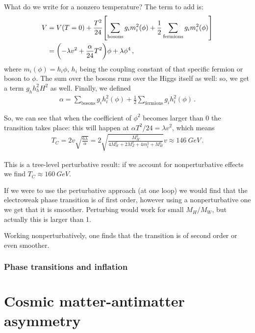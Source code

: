 \documentclass[main.tex]{subfiles}
\begin{document}
What do we write for a nonzero temperature? The term to add is: 
%
\begin{align}
V &= V(T = 0) + \frac{T^2}{24} \qty[ \sum _{\text{bosons}} g_i m_i^2 (\phi ) + \frac{1}{2} \sum _{\text{fermions}} g_i m_i^2 (\phi )]  \\
&= \qty(- \lambda v^2 + \frac{\alpha}{24} T^2) \phi  + \lambda \phi^{4}
\,,
\end{align}
%
where \(m_i (\phi ) = h_i \phi \), \(h_i\) being the coupling constant of that specific fermion or boson to \(\phi \). 
The sum over the bosons runs over the Higgs itself as well: so, we get a term \(g_h h_h^2 H^2\) as well. 
Finally, we defined 
%
\begin{align}
\alpha = \sum _{\text{bosons}} g_i h_i^2 (\phi ) + \frac{1}{2} \sum _{\text{fermions}} g_i h_i^2 (\phi )
\,.
\end{align}

So, we can see that when the coefficient of \(\phi^2\) becomes larger than \(0\) the transition takes place: this will happen at \(\alpha T^2 / 24 = \lambda v^2\), which means 
%
\begin{align}
T_C = 2 v \sqrt{ \frac{6\lambda}{\alpha }} 
= 2 \sqrt{ \frac{M_H^2}{4 M_W^2 + 2 M_Z^2 + 4 m_t^2 + M_H^2}} v 
\approx \SI{146}{GeV}
\,.
\end{align}

This is a tree-level perturbative result: if we account for nonperturbative effects we find \(T_C \approx \SI{160}{GeV}\). 

If we were to use the perturbative approach (at one loop) we would find that the electroweak phase transition is of first order, however using a nonperturbative one we get that it is smoother. 
Perturbing would work for small \( M_H / M_W \), but actually this is larger than 1. 

Working nonperturbatively, one finds that the transition is of second order or even smoother. 

\subsubsection{Phase transitions and inflation}



\section{Cosmic matter-antimatter asymmetry}
\end{document}

